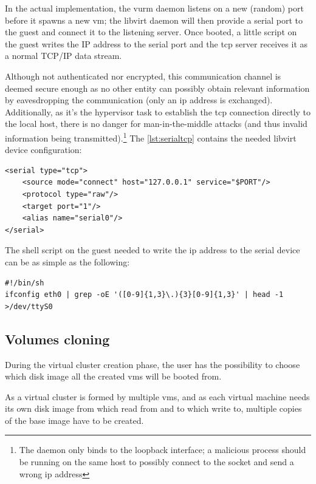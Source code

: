 In the actual implementation, the \gls{vurm} daemon listens on a new (random) port before it spawns a new \gls{vm}; the libvirt daemon will then provide a serial port to the guest and connect it to the listening server. Once booted, a little script on the guest writes the IP address to the serial port and the \gls{tcp} server receives it as a normal TCP/IP data stream.

Although not authenticated nor encrypted, this communication channel is deemed secure enough as no other entity can possibly obtain relevant information by eavesdropping the communication (only an \gls{ip} address is exchanged). Additionally, as it's the hypervisor task to establish the \gls{tcp} connection directly to the local host, there is no danger for man-in-the-middle attacks (and thus invalid information being transmitted).\footnote{The daemon only binds to the loopback interface; a malicious process should be running on the same host to possibly connect to the socket and send a wrong \gls{ip} address}
The \autoref{lst:serialtcp} contains the needed libvirt device configuration:

\lstset{language=xml,caption=Libvirt TCP to serial port device description,label=lst:serialtcp}
\begin{lstlisting}
<serial type="tcp">
    <source mode="connect" host="127.0.0.1" service="$PORT"/>
    <protocol type="raw"/>
    <target port="1"/>
    <alias name="serial0"/>
</serial>
\end{lstlisting}

The shell script on the guest needed to write the \gls{ip} address to the serial device can be as simple as the following:

\begin{lstlisting}
#!/bin/sh
ifconfig eth0 | grep -oE '([0-9]{1,3}\.){3}[0-9]{1,3}' | head -1 >/dev/ttyS0
\end{lstlisting}


\subsection{Volumes cloning}
\label{sec:volumes-cloning}

During the virtual cluster creation phase, the user has the possibility to choose which disk image all the created \glspl{vm} will be booted from.

As a virtual cluster is formed by multiple \glspl{vm}, and as each virtual machine needs its own disk image from which read from and to which write to, multiple copies of the base image have to be created.


